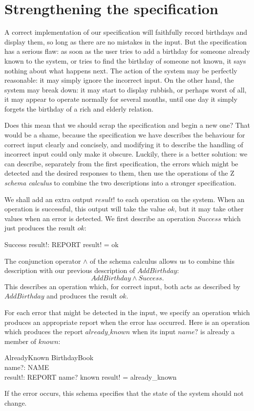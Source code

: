 \documentclass[12pt]{article}
\begin{document}
\section{Strengthening the specification}

A correct implementation of our specification will faithfully record
birthdays and display them, so long as there are no mistakes in the
input. But the specification has a serious flaw: as soon as the user
tries to add a birthday for someone already known to the system, or
tries to find the birthday of someone not known, it says nothing about
what happens next. The action of the system may be perfectly
reasonable: it may simply ignore the incorrect input. On the other
hand, the system may break down: it may start to display rubbish, or
perhaps worst of all, it may appear to operate normally for several
months, until one day it simply forgets the birthday of a rich and
elderly relation.

Does this mean that we should scrap the specification and begin a new
one? That would be a shame, because the specification we have describes
the behaviour for correct input clearly and concisely, and modifying it
to describe the handling of incorrect input could only make it obscure.
Luckily, there is a better solution: we can describe, separately from
the first specification, the errors which might be detected and the
desired responses to them, then use the operations of the Z {\em schema
calculus\/} to combine the two descriptions into a stronger
specification.

We shall add an extra output $result!$ to each operation on the system.
When an operation is successful, this output will take the value $ok$,
but it may take other values when an error is detected. We first
describe an operation $Success$ which just produces the result $ok$:
\begin{schema}{Success}
	result!: REPORT
\where
	result! = ok
\end{schema}
The conjunction operator $\land$ of the schema calculus allows us to
combine this description with our previous description of $AddBirthday$:
\[
	AddBirthday \land Success.
\]
This describes an operation which, for correct input, both acts as
described by $AddBirthday$ and produces the result $ok$.

For each error that might be detected in the input, we specify an
operation which produces an appropriate report when the error has
occurred. Here is an operation which produces the report
$already\_known$ when its input $name?$ is already a member of $known$:
\begin{schema}{AlreadyKnown}
	\Xi BirthdayBook \\
	name?: NAME \\
	result!: REPORT
\where
	name? \in known
\also
	result! = already\_known
\end{schema}
If the error occurs, this schema specifies that the state of the system
should not change.
\end{document}
